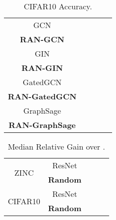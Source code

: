\documentclass[10pt,twocolumn,twoside]{IEEEtran}
\begin{document}
\begin{table}[]
\caption{CIFAR10 Accuracy.} \label{table:CIFAR}
\setlength\tabcolsep{2pt} 
\renewcommand{\arraystretch}{1.5}
\centering
\begin{tabular}{ccccc}
     &  &  &  &  \\ \hline
GCN &  &  &  &  \\
\textbf{RAN-GCN} &  &  &  &  \\ \hline
GIN &  &   &  & \\
\textbf{RAN-GIN}&  &  &  &  \\ \hline
GatedGCN &  &  &  & \\
\textbf{RAN-GatedGCN} &  &  &  &  \\ \hline
GraphSage &  &  &  & \\
\textbf{RAN-GraphSage} &  &  &  &  \\ \hline
\end{tabular}
\end{table}

\begin{table}
\caption{Median Relative Gain over .} \label{table:gain}
\setlength\tabcolsep{3pt} 
\renewcommand{\arraystretch}{1.5}
\centering
\begin{tabular}{ccccc}
                        &        &                 &                 &                 \\ \hline
\multirow{2}{*}{ZINC}   & ResNet &             &             &             \\ \cline{2-5}
                        & \textbf{Random} &   &    &    \\ \hline
\multirow{2}{*}{CIFAR10}& ResNet &             &             &             \\ \cline{2-5}
                        & \textbf{Random} &   &    &    \\ \hline         
\end{tabular}
\end{table}
\end{document}
